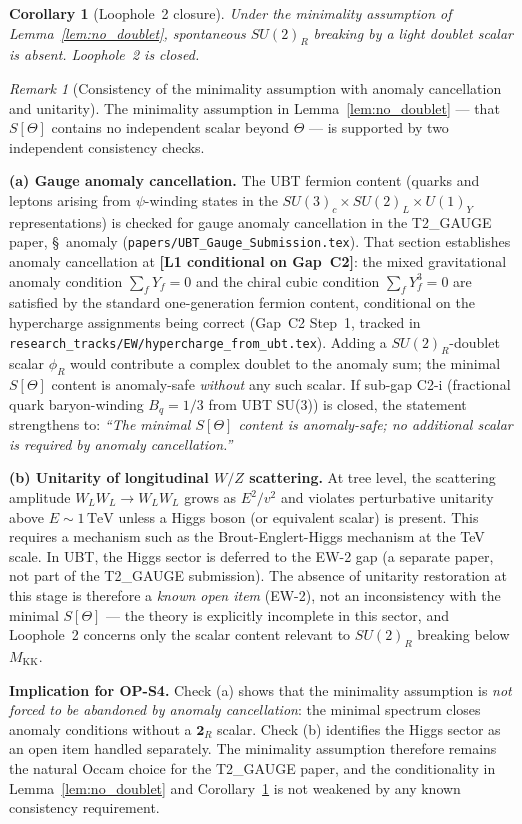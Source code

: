 \documentclass[12pt,a4paper]{article}
\newtheorem{corollary}[theorem]{Corollary}
\theoremstyle{definition}
\theoremstyle{remark}
\newtheorem{remark}[theorem]{Remark}
\begin{document}
\begin{corollary}[Loophole~2 closure]
\label{cor:loophole2_closed}
Under the minimality assumption of Lemma~\ref{lem:no_doublet}, spontaneous
$SU(2)_R$ breaking by a light doublet scalar is absent. Loophole~2 is closed.
\end{corollary}

\begin{remark}[Consistency of the minimality assumption with anomaly cancellation and unitarity]
\label{rem:minimality_anomaly}
The minimality assumption in Lemma~\ref{lem:no_doublet} — that $S[\Theta]$ contains
no independent scalar beyond $\Theta$ — is supported by two independent consistency checks.

\medskip
\noindent\textbf{(a) Gauge anomaly cancellation.}
The UBT fermion content (quarks and leptons arising from $\psi$-winding states in the
$SU(3)_c \times SU(2)_L \times U(1)_Y$ representations) is checked for gauge
anomaly cancellation in the T2\_GAUGE paper, §~anomaly
(\texttt{papers/UBT\_Gauge\_Submission.tex}).
That section establishes anomaly cancellation at \textbf{[L1 conditional on Gap~C2]}:
the mixed gravitational anomaly condition $\sum_f Y_f = 0$ and the chiral cubic
condition $\sum_f Y_f^3 = 0$ are satisfied by the standard one-generation fermion
content, conditional on the hypercharge assignments being correct
(Gap~C2 Step~1, tracked in
\texttt{research\_tracks/EW/hypercharge\_from\_ubt.tex}).
Adding a $SU(2)_R$-doublet scalar $\phi_R$ would contribute a complex doublet to
the anomaly sum; the minimal $S[\Theta]$ content is anomaly-safe \emph{without}
any such scalar.
If sub-gap C2-i (fractional quark baryon-winding $B_q=1/3$ from UBT SU(3)) is closed, the statement strengthens to:
\emph{``The minimal $S[\Theta]$ content is anomaly-safe; no additional scalar is
required by anomaly cancellation.''}

\medskip
\noindent\textbf{(b) Unitarity of longitudinal $W/Z$ scattering.}
At tree level, the scattering amplitude $W_L W_L \to W_L W_L$ grows as $E^2/v^2$
and violates perturbative unitarity above $E\sim 1\,\mathrm{TeV}$ unless a Higgs
boson (or equivalent scalar) is present.
This requires a mechanism such as the Brout-Englert-Higgs mechanism at the TeV scale.
In UBT, the Higgs sector is deferred to the EW-2 gap (a separate paper,
not part of the T2\_GAUGE submission).
The absence of unitarity restoration at this stage is therefore a \emph{known open item}
(EW-2), not an inconsistency with the minimal $S[\Theta]$ — the theory is explicitly
incomplete in this sector, and Loophole~2 concerns only the scalar content relevant
to $SU(2)_R$ breaking below $M_{\mathrm{KK}}$.

\medskip
\noindent\textbf{Implication for OP-S4.}
Check (a) shows that the minimality assumption is \emph{not forced to be abandoned
by anomaly cancellation}: the minimal spectrum closes anomaly conditions without a
$\mathbf{2}_R$ scalar.
Check (b) identifies the Higgs sector as an open item handled separately.
The minimality assumption therefore remains the natural Occam choice for the
T2\_GAUGE paper, and the conditionality in Lemma~\ref{lem:no_doublet} and
Corollary~\ref{cor:loophole2_closed} is not weakened by any known consistency requirement.
\end{remark}
\end{document}
